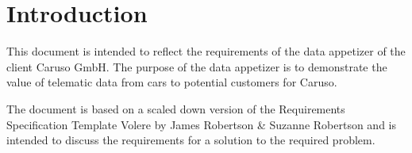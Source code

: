 \chapter{Introduction}
This document is intended to reflect the requirements of the data appetizer of the client Caruso GmbH. The purpose of the data appetizer is to demonstrate the value of telematic data from cars to potential customers for Caruso.

The document is based on a scaled down version of the Requirements Specification Template Volere by James Robertson \& Suzanne Robertson and is intended to discuss the requirements for a solution to the required problem.
